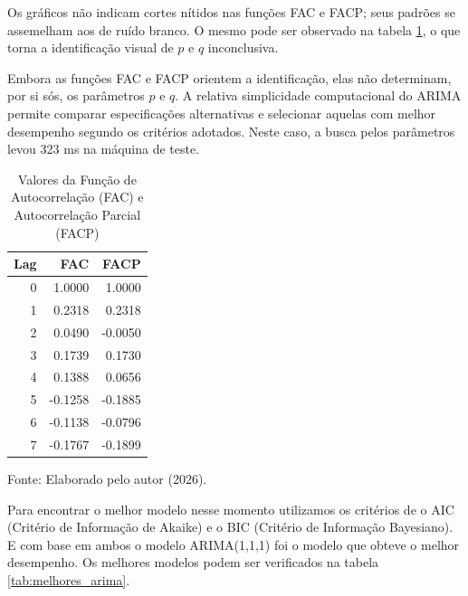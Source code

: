 Os gráficos não indicam cortes nítidos nas funções FAC e FACP; seus padrões se assemelham aos de ruído branco. O mesmo pode ser observado na tabela \ref{tab:FAC_FACP_ARIMA}, o que torna a identificação visual de $p$ e $q$ inconclusiva.

Embora as funções FAC e FACP orientem a identificação, elas não determinam, por si sós, os parâmetros $p$ e $q$. A relativa simplicidade computacional do ARIMA permite comparar especificações alternativas e selecionar aquelas com melhor desempenho segundo os critérios adotados. Neste caso, a busca pelos parâmetros levou 323 ms na máquina de teste.

\begin{table}[htbp]
	\centering
	\captionsetup{justification=centering}
	\caption{Valores da Função de Autocorrelação (FAC) e Autocorrelação Parcial (FACP)}
	\label{tab:FAC_FACP_ARIMA}
	\begin{tabular}{rrr}
		\toprule
		Lag & FAC & FACP \\
		\midrule
		0 & 1.0000 & 1.0000 \\
		1 & 0.2318 & 0.2318 \\
		2 & 0.0490 & -0.0050 \\
		3 & 0.1739 & 0.1730 \\
		4 & 0.1388 & 0.0656 \\
		5 & -0.1258 & -0.1885 \\
		6 & -0.1138 & -0.0796 \\
		7 & -0.1767 & -0.1899 \\
		\bottomrule
	\end{tabular}
	\vspace{0.1cm} %
	
	\centering
	\small Fonte: Elaborado pelo autor (2026).
\end{table}


Para encontrar o melhor modelo nesse momento utilizamos os critérios de o AIC (Critério de Informação de Akaike) e o BIC (Critério de Informação Bayesiano). E com base em ambos o modelo ARIMA(1,1,1) foi o modelo que obteve o melhor desempenho. Os melhores modelos podem ser verificados na tabela \ref{tab:melhores_arima}. 

